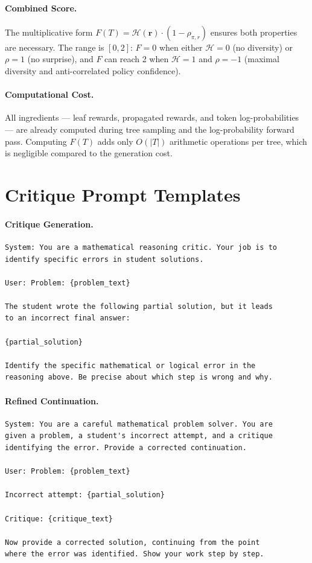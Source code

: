 \documentclass{article} %
\begin{document}
\paragraph{Combined Score.} The multiplicative form $F(T) = \mathcal{H}(\mathbf{r}) \cdot (1 - \rho_{\pi,r})$ ensures both properties are necessary. The range is $[0, 2]$: $F = 0$ when either $\mathcal{H} = 0$ (no diversity) or $\rho = 1$ (no surprise), and $F$ can reach 2 when $\mathcal{H} = 1$ and $\rho = -1$ (maximal diversity and anti-correlated policy confidence).

\paragraph{Computational Cost.} All ingredients --- leaf rewards, propagated rewards, and token log-probabilities --- are already computed during tree sampling and the log-probability forward pass. Computing $F(T)$ adds only $O(|T|)$ arithmetic operations per tree, which is negligible compared to the generation cost.


\section{Critique Prompt Templates}
\label{app:prompts}

\paragraph{Critique Generation.}
\begin{verbatim}
System: You are a mathematical reasoning critic. Your job is to
identify specific errors in student solutions.

User: Problem: {problem_text}

The student wrote the following partial solution, but it leads
to an incorrect final answer:

{partial_solution}

Identify the specific mathematical or logical error in the
reasoning above. Be precise about which step is wrong and why.
\end{verbatim}

\paragraph{Refined Continuation.}
\begin{verbatim}
System: You are a careful mathematical problem solver. You are
given a problem, a student's incorrect attempt, and a critique
identifying the error. Provide a corrected continuation.

User: Problem: {problem_text}

Incorrect attempt: {partial_solution}

Critique: {critique_text}

Now provide a corrected solution, continuing from the point
where the error was identified. Show your work step by step.
\end{verbatim}
\end{document}

